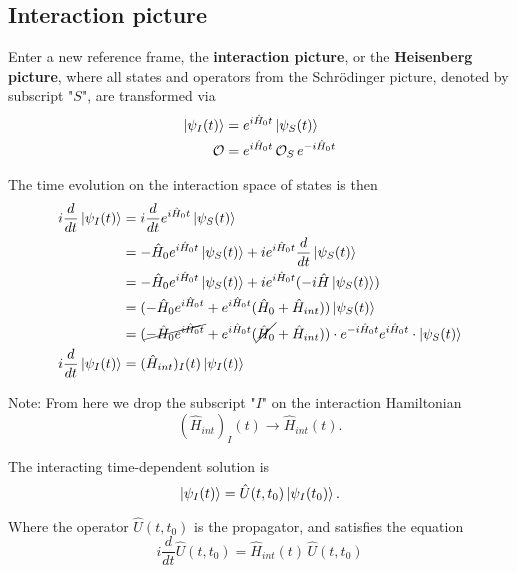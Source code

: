 \subsection*{Interaction picture}

\noindent Enter a new reference frame, the \textbf{interaction picture}, or the \textbf{Heisenberg picture}, where all states and operators from the Schr\"odinger picture, denoted by subscript "$S$", are transformed via
\begin{align}
\ket{\psi_I (t)} &= e^{i\hat{H}_0 t} \ket{\psi_S (t)} \\
\mathcal{O} &= e^{i\hat{H}_0 t} \, \mathcal{O}_S  \, e^{-i\hat{H}_0 t}
\end{align}

\noindent The time evolution on the interaction space of states is then
\begin{align}
i \frac{d}{dt} \ket{\psi_I (t)} &=  i \frac{d}{dt} e^{i\hat{H}_0 t} \ket{\psi_S (t)} \\
&= - \hat{H}_0 e^{i\hat{H}_0 t} \ket{\psi_S (t)}  + i e^{i\hat{H}_0 t} \frac{d}{dt} \ket{\psi_S (t)} \\
&= - \hat{H}_0 e^{i\hat{H}_0 t} \ket{\psi_S (t)} + i e^{i\hat{H}_0 t}(-i\hat{H}\ket{\psi_S (t)}) \\
&= (- \hat{H}_0 e^{i\hat{H}_0 t} + e^{i\hat{H}_0 t} (\hat{H}_0 + \hat{H}_{int})) \ket{\psi_S (t)} \\
&= (\cancel{- \hat{H}_0 e^{i\hat{H}_0 t}} + e^{i\hat{H}_0 t} (\cancel{\hat{H}_0} + \hat{H}_{int})) \cdot e^{-i\hat{H}_0 t} e^{i\hat{H}_0 t} \cdot \ket{\psi_S (t)} \\
i \frac{d}{dt} \ket{\psi_I (t)} &= (\hat{H}_{int})_I (t) \ket{\psi_I (t)} 
\end{align}

\noindent Note: From here we drop the subscript "$I$" on the interaction Hamiltonian 
\begin{equation}
(\hat{H}_{int})_I (t) \rightarrow \hat{H}_{int} (t).
\end{equation}

\noindent The interacting time-dependent solution is
\begin{equation}
\ket{\psi_I (t)}  = \hat{U}(t,t_0) \ket{\psi_I (t_0)}. 
\end{equation}

\noindent Where the operator $\hat{U}(t,t_0)$ is the propagator, and satisfies the equation
\begin{equation}
i \frac{d}{dt} \hat{U}(t,t_0) = \hat{H}_{int} (t) \, \hat{U}(t,t_0)
\end{equation}

